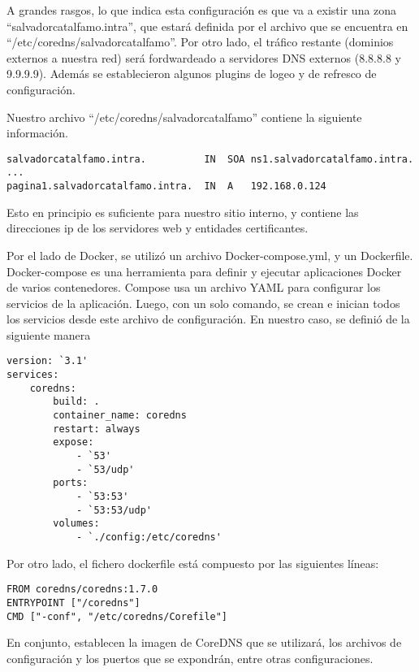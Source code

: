 A grandes rasgos, lo que indica esta configuración es que va a existir una zona 
“salvadorcatalfamo.intra”, que estará definida por el archivo que se encuentra en 
“/etc/coredns/salvadorcatalfamo”. Por otro lado, el tráfico restante (dominios externos a nuestra red)
será fordwardeado a 
servidores DNS externos (8.8.8.8 y 9.9.9.9). Además se establecieron algunos plugins de logeo y 
de refresco de configuración.

Nuestro archivo “/etc/coredns/salvadorcatalfamo” contiene la siguiente información.
\begin{verbatim}
salvadorcatalfamo.intra.          IN  SOA ns1.salvadorcatalfamo.intra. ...
pagina1.salvadorcatalfamo.intra.  IN  A   192.168.0.124   
\end{verbatim}

Esto en principio es suficiente para nuestro sitio interno, y contiene las direcciones ip de los 
servidores web y entidades certificantes.

Por el lado de Docker, se utilizó un archivo Docker-compose.yml, y un Dockerfile. 
Docker-compose es una herramienta para definir y ejecutar aplicaciones Docker de 
varios contenedores. Compose usa un archivo YAML para configurar los servicios de 
la aplicación. Luego, con un solo comando, se crean e inician todos los servicios 
desde este archivo de configuración. En nuestro caso, se definió de la siguiente 
manera

\begin{verbatim}
version: `3.1'
services:
    coredns:
        build: .
        container_name: coredns
        restart: always
        expose:
            - `53'
            - `53/udp'
        ports:
            - `53:53'
            - `53:53/udp'
        volumes:
            - `./config:/etc/coredns'    
\end{verbatim}

\noindent Por otro lado, el fichero dockerfile está compuesto por las siguientes líneas:
\begin{verbatim}
FROM coredns/coredns:1.7.0
ENTRYPOINT ["/coredns"]
CMD ["-conf", "/etc/coredns/Corefile"]    
\end{verbatim}

En conjunto, establecen la imagen de CoreDNS que se utilizará, los archivos de configuración y
los puertos que se expondrán, entre otras configuraciones.
